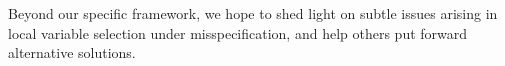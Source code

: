 


Beyond our specific framework, we hope to shed light on subtle issues arising in local variable selection under misspecification, and help others put forward alternative solutions. 




